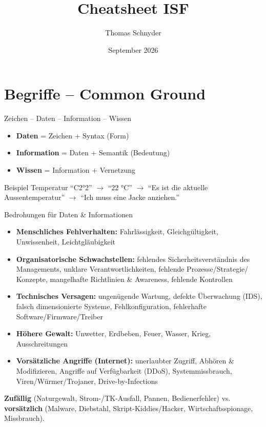\documentclass[a4paper, fontsize=7pt]{scrartcl}
\title{Cheatsheet ISF}
\author{Thomas Schnyder}
\date{September 2026}
\begin{document}
\maketitle

\section{Begriffe -- Common Ground}

\begin{mainbox}{Zeichen -- Daten -- Information -- Wissen}
\begin{itemize}
    \item \textbf{Daten} = Zeichen + Syntax (Form)
    \item \textbf{Information} = Daten + Semantik (Bedeutung)
    \item \textbf{Wissen} = Information + Vernetzung
\end{itemize}
\end{mainbox}

\begin{subbox}{Beispiel Temperatur}
``C2°2'' $\to$ ``22 °C'' $\to$ ``Es ist die aktuelle Aussentemperatur''
$\to$ ``Ich muss eine Jacke anziehen.''
\end{subbox}

\begin{mainbox}{Bedrohungen für Daten \& Informationen}
\begin{itemize}
    \item \textbf{Menschliches Fehlverhalten:} Fahrlässigkeit, Gleichgültigkeit,
          Unwissenheit, Leichtgläubigkeit
    \item \textbf{Organisatorische Schwachstellen:} fehlendes Sicherheitsverständnis
          des Managements, unklare Verantwortlichkeiten, fehlende Prozesse/Strategie/
          Konzepte, mangelhafte Richtlinien \& Awareness, fehlende Kontrollen
    \item \textbf{Technisches Versagen:} ungenügende Wartung, defekte Überwachung (IDS),
          falsch dimensionierte Systeme, Fehlkonfiguration, fehlerhafte
          Software/Firmware/Treiber
    \item \textbf{Höhere Gewalt:} Unwetter, Erdbeben, Feuer, Wasser, Krieg,
          Ausschreitungen
    \item \textbf{Vorsätzliche Angriffe (Internet):} unerlaubter Zugriff, Abhören \&
          Modifizieren, Angriffe auf Verfügbarkeit (DDoS), Systemmissbrauch,
          Viren/Würmer/Trojaner, Drive-by-Infections
\end{itemize}
\textbf{Zufällig} (Naturgewalt, Strom-/TK-Ausfall, Pannen, Bedienerfehler) vs.
\textbf{vorsätzlich} (Malware, Diebstahl, Skript-Kiddies/Hacker,
Wirtschaftsspionage, Missbrauch).
\end{mainbox}
\end{document}
